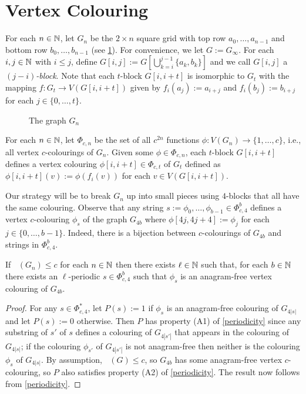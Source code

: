 \documentclass{patmorin}
\DeclareMathOperator{\afcn}{\dot{\chi}_\pi}
\begin{document}
\section{Vertex Colouring}
\label{vertex_colourings}

For each $n\in\mathbb{N}$, let $G_n$ be the $2\times n$ square grid with top row $a_0,\ldots,a_{n-1}$ and bottom row $b_0,\ldots,b_{n-1}$ (see \cref{g_n}). For convenience, we let $G:=G_\infty$.  For each $i,j\in\mathbb{N}$ with $i\le j$, define $G[i,j]:=G[\bigcup_{k=i}^{j-1}\{a_k,b_k\}]$ and we call $G[i,j]$ a \emph{$(j-i)$-block}. Note that each $t$-block $G[i,i+t]$ is isomorphic to $G_t$ with the mapping $f:G_t\to V(G[i,i+t])$ given by $f_i(a_{j}):=a_{i+j}$ and $f_i(b_{j}):=b_{i+j}$ for each $j\in\{0,\ldots,t\}$.

\begin{figure}
    \begin{center}
\end{center}
\caption{The graph $G_n$}
\label{g_n}
\end{figure}

For each $n\in\mathbb{N}$, let $\Phi_{c,n}$ be the set of all $c^{2n}$ functions $\phi:V(G_n)\to\{1,\ldots,c\}$, i.e., all vertex $c$-colourings of $G_n$.
Given some $\phi\in\Phi_{c,n}$, each $t$-block $G[i,i+t]$ defines a vertex colouring $\phi[i,i+t]\in \Phi_{c,t}$ of $G_t$ defined as $\phi[i,i+t](v):=\phi(f_i(v))$ for each $v\in V(G[i,i+t])$.

Our strategy will be to break $G_n$ up into small pieces using $4$-blocks that all have the same colouring. Observe that any string $s:=\phi_0,\ldots,\phi_{b-1}\in\Phi_{c,4}^b$ defines a vertex $c$-colouring $\phi_s$ of the graph $G_{4b}$ where $\phi[4j,4j+4]:=\phi_j$ for each $j\in\{0,\ldots,b-1\}$.  Indeed, there is a bijection between $c$-colourings of $G_{4b}$ and strings in $\Phi_{c,4}^b$.

\begin{lem}\label{breakers}
    If $\afcn(G_n)\le c$ for each $n\in\mathbb{N}$ then there exists $\ell\in\mathbb{N}$ such that, for each $b\in\mathbb{N}$ there exists an $\ell$-periodic $s\in\Phi_{c,4}^b$ such that $\phi_s$ is an anagram-free vertex colouring of $G_{4b}$.
\end{lem}

\begin{proof}
    For any $s\in\Phi_{c,4}^*$, let $P(s):=1$ if $\phi_s$ is an anagram-free colouring of $G_{4|s|}$ and let $P(s):=0$ otherwise.  Then $P$ has property (A1) of \cref{periodicity} since any substring of $s'$ of $s$ defines a colouring of $G_{4|s'|}$ that appears in the colouring of $G_{4|s|}$; if the colouring $\phi_{s'}$ of $G_{4|s'|}$ is not anagram-free then neither is the colouring $\phi_s$ of $G_{4|s|}$. By assumption, $\afcn(G)\le c$, so $G_{4b}$ has some anagram-free vertex $c$-colouring, so $P$ also satisfies property (A2) of \cref{periodicity}.  The result now follows from  \cref{periodicity}.
\end{proof}
\end{document}
